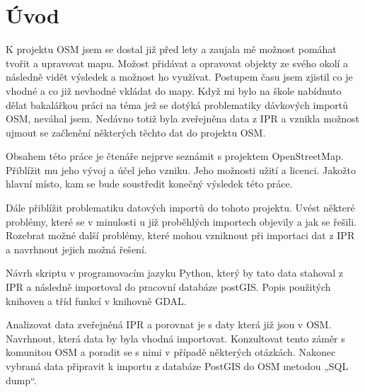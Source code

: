 \chapter{Úvod}
\label{1-uvod}

K projektu OSM jsem se dostal již před lety a zaujala mě možnost pomáhat tvořit a upravovat mapu. Možost přidávat a opravovat objekty ze svého okolí a následně vidět výsledek a možnost ho využívat. Postupem času jsem zjistil co je vhodné a co již nevhodné vkládat do mapy. Když mi bylo na škole nabídnuto dělat bakalářkou práci na téma jež se dotýká problematiky dávkových importů OSM, neváhal jsem.
Nedávno totiž byla zveřejněna data z IPR a vznikla možnost ujmout se začlenění některých těchto dat do projektu OSM. 


Obsahem této práce je čtenáře nejprve seznámit s projektem OpenStreetMap. Přiblížit mu jeho vývoj a účel jeho vzniku. Jeho možnosti užití a licenci. Jakožto hlavní místo, kam se bude soustředit konečný výsledek této práce.

Dále přiblížit problematiku datových importů do tohoto projektu. Uvést některé problémy, které se v minulosti u již proběhlých importech objevily a jak se řešili. Rozebrat možné další problémy, které mohou vzniknout při importaci dat z IPR a navrhnout jejich možná řešení. 

Návrh skriptu v programovacím jazyku Python, který by tato data stahoval z IPR a následně importoval do pracovní databáze postGIS. Popis použitých knihoven a tříd funkcí v knihovně GDAL.

Analizovat data zveřejněná IPR a porovnat je s daty která již jsou v OSM. Navrhnout, která data by byla vhodná importovat. Konzultovat tento záměr s komunitou OSM a poradit se s nimi v případě některých otázkách. Nakonec vybraná data připravit k importu z databáze PostGIS do OSM metodou „SQL dump“.
